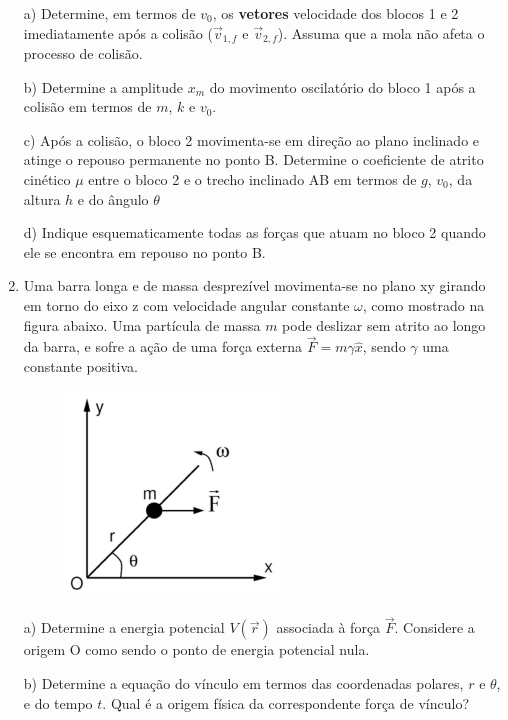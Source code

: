 \begin{enumerate}[start=1,label={\bfseries Q\arabic*.}]
a) Determine, em termos de $v_{0}$, os \textbf{vetores} velocidade dos blocos 1 e 2 imediatamente após a colisão ($\vec{v}_{1,f}$ e $\vec{v}_{2,f}$). Assuma que a mola não afeta o processo de colisão.

\resposta


b) Determine a amplitude $x_{m}$ do movimento oscilatório do bloco 1 após a colisão em termos de $m$, $k$ e $v_{0}$.

\resposta

c) Após a colisão, o bloco 2 movimenta-se em direção ao plano inclinado e atinge o repouso permanente no ponto B. Determine o coeficiente de atrito cinético $\mu$ entre o bloco 2 e o trecho inclinado AB em termos de $g$, $v_{0}$, da altura $h$ e do ângulo $\theta$

\resposta

d) Indique esquematicamente todas as forças que atuam no bloco 2 quando ele se encontra em repouso no ponto B.

\resposta



\item Uma barra longa e de massa desprezível movimenta-se no plano xy girando em torno do eixo z com velocidade angular constante $\omega$, como mostrado na figura abaixo. Uma partícula de massa $m$ pode deslizar sem atrito ao longo da barra, e sofre a ação de uma força externa $\vec{F} = m\gamma \hat{x}$, sendo $\gamma$ uma constante positiva.

\begin{figure}[H]
\centering
\includegraphics[scale=0.8]{classica-img/barra.png}
\end{figure}



a) Determine a energia potencial $V(\vec{r})$ associada à força $\vec{F}$. Considere a origem O como sendo o ponto de energia potencial nula.

\resposta

b) Determine a equação do vínculo em termos das coordenadas polares, $r$ e $\theta$, e do tempo $t$. Qual é a origem física da correspondente força de vínculo?


\end{enumerate}
